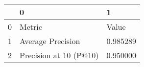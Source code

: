 \begin{tabular}{lll}
\toprule
 & 0 & 1 \\
\midrule
0 & Metric & Value \\
1 & Average Precision & 0.985289 \\
2 & Precision at 10 (P@10) & 0.950000 \\
\bottomrule
\end{tabular}
